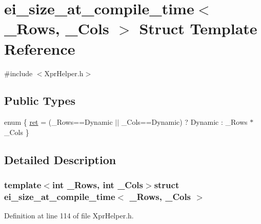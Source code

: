 \hypertarget{structei__size__at__compile__time}{\section{ei\-\_\-size\-\_\-at\-\_\-compile\-\_\-time$<$ \-\_\-\-Rows, \-\_\-\-Cols $>$ Struct Template Reference}
\label{structei__size__at__compile__time}
}


{\ttfamily \#include $<$Xpr\-Helper.\-h$>$}

\subsection*{Public Types}
\begin{DoxyCompactItemize}
\item 
enum \{ \hyperlink{structei__size__at__compile__time_a0ace67db87575423352043f1c3c5719eabe30e73d04e66ca2c7d5ddfddb2d0a27}{ret} = (\-\_\-\-Rows==Dynamic $|$$|$ \-\_\-\-Cols==Dynamic) ? Dynamic \-: \-\_\-\-Rows $\ast$ \-\_\-\-Cols
 \}
\end{DoxyCompactItemize}


\subsection{Detailed Description}
\subsubsection*{template$<$int \-\_\-\-Rows, int \-\_\-\-Cols$>$struct ei\-\_\-size\-\_\-at\-\_\-compile\-\_\-time$<$ \-\_\-\-Rows, \-\_\-\-Cols $>$}



Definition at line 114 of file Xpr\-Helper.\-h.



